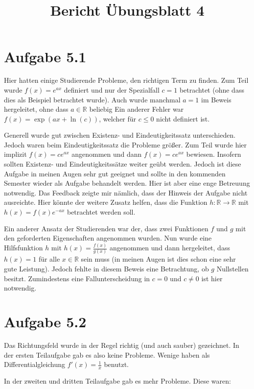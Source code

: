 \documentclass[a4paper]{article}
\title{Bericht Übungsblatt 4}
\date{}
\newcommand*{\R}{\mathbb R}
\begin{document}
\maketitle

\section{Aufgabe 5.1}

Hier hatten einige Studierende Probleme, den richtigen Term zu finden. Zum Teil wurde $f(x)=e^{ax}$ definiert und nur der Spezialfall $c=1$ betrachtet (ohne dass dies als Beispiel betrachtet wurde). Auch wurde manchmal $a=1$ im Beweis hergeleitet, ohne dass $a\in\R$ beliebig Ein anderer Fehler war $f(x)=\exp(ax+\ln(c))$, welcher für $c \le 0$ nicht definiert ist.

Generell wurde gut zwischen Existenz- und Eindeutigkeitssatz unterschieden. Jedoch waren beim Eindeutigkeitssatz die Probleme größer. Zum Teil wurde hier implizit $f(x)=ce^{ax}$ angenommen und dann $f(x)=ce^{ax}$ bewiesen. Insofern sollten Existenz- und Eindeutigkeitssätze weiter geübt werden. Jedoch ist diese Aufgabe in meinen Augen sehr gut geeignet und sollte in den kommenden Semester wieder als Aufgabe behandelt werden. Hier ist aber eine enge Betreuung notwendig. Das Feedback zeigte mir nämlich, dass der Hinweis der Aufgabe nicht ausreichte. Hier könnte der weitere Zusatz helfen, dass die Funktion $h:\R\to\R$ mit $h(x)=f(x)e^{-ax}$ betrachtet werden soll.

Ein anderer Ansatz der Studierenden war der, dass zwei Funktionen $f$ und $g$ mit den geforderten Eigenschaften angenommen wurden. Nun wurde eine Hilfsfunktion $h$ mit $h(x)=\frac{f(x)}{g(x)}$ angenommen und dann hergeleitet, dass $h(x)=1$ für alle $x\in\R$ sein muss (in meinen Augen ist dies schon eine sehr gute Leistung). Jedoch fehlte in diesem Beweis eine Betrachtung, ob $g$ Nullstellen besitzt. Zumindestens eine Fallunterscheidung in $c=0$ und $c\neq 0$ ist hier notwendig.

\section{Aufgabe 5.2}

Das Richtungsfeld wurde in der Regel richtig (und auch sauber) gezeichnet. In der ersten Teilaufgabe gab es also keine Probleme. Wenige haben als Differentialgleichung $f'(x)=\frac{1}{x}$ benutzt.

In der zweiten und dritten Teilaufgabe gab es mehr Probleme. Diese waren:
\end{document}

